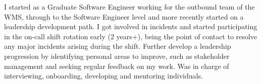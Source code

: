 \begin{cvitems}
    \item{I started as a Graduate Software Engineer working for the outbound team of the WMS, through to the
    Software Engineer level and more recently started on a leadership development path. I got involved in
    incidents and started participating in the on-call shift rotation early (2 years+), being the point of
    contact to resolve any major incidents arising during the shift. Further develop a leadership progression
    by identifying personal areas to improve, such as stakeholder management and seeking regular feedback on
    my work. Was in charge of interviewing, onboarding, developing and mentoring individuals.}
\end{cvitems}